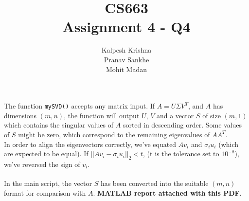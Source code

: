 \documentclass[11pt]{article}
\title{\textbf{CS663 \\ Assignment 4 - Q4}}
\author{Kalpesh Krishna\\ Pranav Sankhe \\ Mohit Madan}
\date{}
\begin{document}
\maketitle
The function \texttt{mySVD()} accepts any matrix input. If $A = U \Sigma V^T$, and $A$ has dimensions $(m, n)$, the function will output $U$, $V$ and a vector $S$ of size $(m, 1)$ which contains the singular values of $A$ sorted in descending order. Some values of $S$ might be zero, which correspond to the remaining eigenvalues of $AA^T$.\\
In order to align the eigenvectors correctly, we've equated $Av_i$ and $\sigma_i u_i$ (which are expected to be equal). If $||Av_i - \sigma_i u_i||_2 < t$, (t is the tolerance set to $10^{-8}$), we've reversed the sign of $v_i$.\\\\
In the main script, the vector $S$ has been converted into the suitable $(m,n)$ format for comparison with $A$. \textbf{MATLAB report attached with this PDF}.
\end{document}
